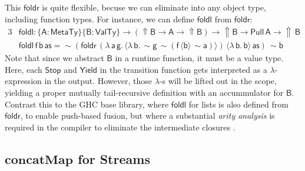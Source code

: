 \documentclass[acmsmall,screen,review,anonymous]{acmart}
\newcommand{\msf}[1]{{\mathsf{#1}}}
\newcommand{\mbf}[1]{{\mathbf{#1}}}
\newcommand{\bs}[1]{\boldsymbol{#1}}
\newcommand{\lam}{\lambda\,}
\newcommand{\vas}{\mathsf{as}}
\newcommand{\vA}{\mathsf{A}}
\newcommand{\vB}{\mathsf{B}}
\newcommand{\va}{\mathsf{a}}
\newcommand{\vb}{\mathsf{b}}
\newcommand{\vf}{\mathsf{f}}
\newcommand{\vg}{\mathsf{g}}
\newcommand{\foldr}{\msf{foldr}}
\newcommand{\foldl}{\msf{foldl}}
\newcommand{\Lift}{{\Uparrow}}
\newcommand{\spl}{{\bs{\sim}}}
\newcommand{\ql}{{\bs{\langle}}}
\newcommand{\qr}{{\bs{\rangle}}}
\newcommand{\MTy}{\msf{MetaTy}}
\newcommand{\VTy}{\msf{ValTy}}
\theoremstyle{remark}
\newcommand{\qt}[1]{\ql#1\qr}
\newcommand{\Stop}{\msf{Stop}}
\newcommand{\Yield}{\msf{Yield}}
\newcommand{\Pull}{\msf{Pull}}
\begin{document}
This $\foldr$ is quite flexible, becuse we can eliminate into any object type,
including function types. For instance, we can define $\foldl$ from $\foldr$:
\begin{alignat*}{3}
  &\foldl : \{\vA : \MTy\}\{\vB : \VTy\} \to (\Lift \vB \to \vA \to \Lift \vB) \to \Lift \vB \to \Pull\,\vA \to \Lift\,\vB\\
  &\foldl\,\vf\,\vb\,\vas = \spl(\foldr\,(\lam \va\,\vg.\,\qt{\lam \vb.\,\spl \vg\,\spl(\vf\,\qt{\vb}\,\spl \va)})\,\qt{\lam \vb.\,\vb}\,\vas)\,\spl \vb
\end{alignat*}
Note that since we abstract $\vB$ in a runtime function, it must be a value
type. Here, each $\Stop$ and $\Yield$ in the transition function gets
interpreted as a $\lambda$-expression in the output. However, those $\lambda$-s
will be lifted out in the scope, yielding a proper mutually tail-recursive
definition with an accummulator for $\vB$. Contrast this to the GHC base
library, where $\foldl$ for lists is also defined from $\foldr$, to enable
push-based fusion, but where a substantial \emph{arity analysis} is required in
the compiler to eliminate the intermediate closures \cite{TODO}.

\subsection{$\mbf{concatMap}$ for Streams}
\end{document}
